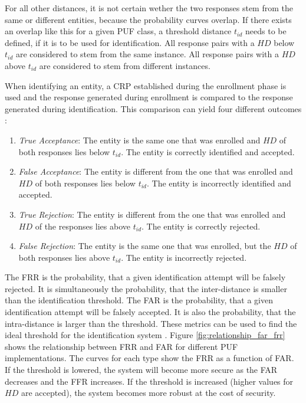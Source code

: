 For all other distances, it is not certain wether the two responses stem from the same or different entities,
because the probability curves overlap. If there exists an overlap like this for a given PUF class,
a threshold distance $t_{id}$ needs to be defined, if it is to be used for identification.
All response pairs with a $HD$ below $t_{id}$ are considered to stem from the same instance.
All response pairs with a $HD$ above $t_{id}$ are considered to stem from different instances. \cite[][p. 121f]{Maes2013}

When identifying an entity, a CRP established during the enrollment phase is used and the response
generated during enrollment is compared to the response generated during identification.
This comparison can yield four different outcomes \cite[][p. 122f]{Maes2013}:
\begin{enumerate}
    \item \emph{True Acceptance}: The entity is the same one that was enrolled and $HD$ of both responses
          lies below $t_{id}$. The entity is correctly identified and accepted.
    \item \emph{False Acceptance}: The entity is different from the one that was enrolled and $HD$ of
          both responses lies below $t_{id}$. The entity is incorrectly identified and
          accepted.
    \item \emph{True Rejection}: The entity is different from the one that was enrolled and $HD$ of the
          responses lies above $t_{id}$. The entity is correctly rejected.
    \item \emph{False Rejection}: The entity is the same one that was enrolled, but the $HD$ of both responses
          lies above $t_{id}$. The entity is incorrectly rejected.
\end{enumerate}

The \ac{FRR} is the probability, that a given identification attempt will be falsely rejected.
It is simultaneously the probability, that the inter-distance is smaller than the identification threshold.
The \ac{FAR} is the probability, that a given identification attempt will be falsely accepted.
It is also the probability, that the intra-distance is larger than the threshold.
These metrics can be used to find the ideal threshold for the identification system \cite[][p. 123]{Maes2013}.
Figure \ref{fig:relationship_far_frr} shows the relationship between FRR and FAR for different PUF implementations.
The curves for each type show the FRR as a function of FAR.
If the threshold is lowered, the system will become more secure as the FAR decreases and the FFR increases.
If the threshold is increased (higher values for $HD$ are accepted), the system becomes more robust at the
cost of security.

